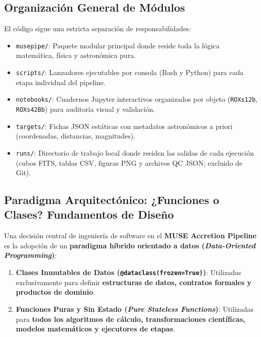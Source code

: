 \documentclass[11pt,a4paper]{article}
\begin{document}
\subsection{Organización General de Módulos}
El código sigue una estricta separación de responsabilidades:
\begin{itemize}[leftmargin=1.2cm]
    \item \texttt{musepipe/}: Paquete modular principal donde reside toda la lógica matemática, física y astronómica pura.
    \item \texttt{scripts/}: Lanzadores ejecutables por consola (Bash y Python) para cada etapa individual del pipeline.
    \item \texttt{notebooks/}: Cuadernos Jupyter interactivos organizados por objeto (\texttt{ROXs12b}, \texttt{ROXs42Bb}) para auditoría visual y validación.
    \item \texttt{targets/}: Fichas JSON estáticas con metadatos astronómicos a priori (coordenadas, distancias, magnitudes).
    \item \texttt{runs/}: Directorio de trabajo local donde residen las salidas de cada ejecución (cubos FITS, tablas CSV, figuras PNG y archivos QC JSON; excluido de Git).
\end{itemize}

\subsection{Paradigma Arquitectónico: ¿Funciones o Clases? Fundamentos de Diseño}

Una decisión central de ingeniería de software en el \textbf{MUSE Accretion Pipeline} es la adopción de un \textbf{paradigma híbrido orientado a datos (\textit{Data-Oriented Programming})}:

\begin{enumerate}[leftmargin=1.0cm]
    \item \textbf{Clases Inmutables de Datos (\texttt{@dataclass(frozen=True)})}: Utilizadas exclusivamente para definir \textbf{estructuras de datos, contratos formales y productos de dominio}.
    \item \textbf{Funciones Puras y Sin Estado (\textit{Pure Stateless Functions})}: Utilizadas para \textbf{todos los algoritmos de cálculo, transformaciones científicas, modelos matemáticos y ejecutores de etapas}.
\end{enumerate}
\end{document}
